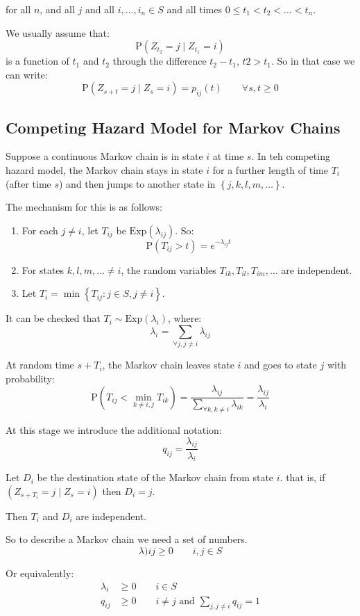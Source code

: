 \documentclass[english,12pt]{article}
\theoremstyle{plain}
\theoremstyle{definition}
\theoremstyle{definition} %
\newcommand{\enum}[1]{\begin{enumerate} #1 \end{enumerate}}
\newcommand{\curlybrac}[1]{\left\{#1\right\}} %
\begin{document}
for all $n$, and all $j$ and all $i,\ldots,i_n\in S$ and all times $0\le t_1<t_2<\ldots <t_n$.

We usually assume that:
\[\text{P}(Z_{t_2}=j\mid Z_{t_1}=i)\]
is a function of $t_1$ and $t_2$ through the difference $t_2-t_1$, $t2>t_1$.  So in that case we can write:
\[\text{P}(Z_{s+t}=j\mid Z_s=i)=p_{ij}(t)\qquad\forall s,t\ge 0\]

\subsection{Competing Hazard Model for Markov Chains}
Suppose a continuous Markov chain is in state $i$ at time $s$.  In teh competing hazard model, the Markov chain stays in state $i$ for a further length of time $T_i$ (after time $s$) and then jumps to another state in $\curlybrac{j,k,l,m,\ldots}$.

The mechanism for this is as follows:
\enum{
\item For each $j\ne i$, let $T_{ij}$ be $\text{Exp}(\lambda_{ij})$.  So:
\[\text{P}(T_{ij}>t)=e^{-\lambda_{ij}t}\]
\item For states $k,l,m,\ldots\ne i$, the random variables $T_{ik}, T_{il}, T_{im},\ldots $ are independent.
\item Let $T_i=\min\curlybrac{T_{ij}:j\in S, j\ne i}$.
}

It can be checked that $T_i\sim\text{Exp}(\lambda_i)$, where:
\[\lambda_i=\sum_{\forall j, j\ne i}\lambda_{ij}\]

At random time $s+T_i$, the Markov chain leaves state $i$ and goes to state $j$ with probability:
\[\text{P}(T_{ij}<\min_{k\ne i,j}T_{ik})=\frac{\lambda_{ij}}{\sum_{\forall k, k\ne i}\lambda_{ik}}=\frac{\lambda_{ij}}{\lambda_i}\]

At this stage we introduce the additional notation:
\[q_{ij}=\frac{\lambda_{ij}}{\lambda_i}\]

Let $D_i$ be the destination state of the Markov chain from state $i$.  that is, if $(Z_{s+T_i}=j\mid Z_s=i)$ then $D_i=j$.

Then $T_i$ and $D_i$ are independent.

So to describe a Markov chain we need a set of numbers.
\[\lambda){ij}\ge 0\qquad i,j\in S\]

Or equivalently:
\begin{align*}
\lambda_i&\ge 0\qquad i\in S\\
q_{ij}&\ge 0\qquad i\ne j \text{ and }\sum_{j,j\ne i}q_{ij}=1
\end{align*}
\end{document}

